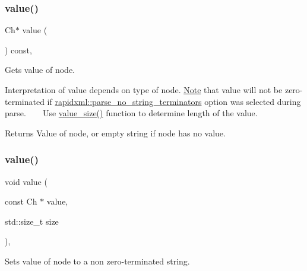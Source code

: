\subsubsection{\texorpdfstring{value()}{value()}\hspace{0.1cm}{\footnotesize\ttfamily [1/3]}}
{\footnotesize\ttfamily Ch$\ast$ value (\begin{DoxyParamCaption}{ }\end{DoxyParamCaption}) const\hspace{0.3cm}{\ttfamily [inline]}, {\ttfamily [inherited]}}



Gets value of node. 

Interpretation of value depends on type of node. \mbox{\hyperlink{classNote}{Note}} that value will not be zero-\/terminated if \mbox{\hyperlink{namespacerapidxml_a9cae3801e70437cbc410c24bf6be691c}{rapidxml\+::parse\+\_\+no\+\_\+string\+\_\+terminators}} option was selected during parse. ~\newline
~\newline
 Use \mbox{\hyperlink{classrapidxml_1_1xml__base_aa6981b3244607ea4ae7634f74f25361b}{value\+\_\+size()}} function to determine length of the value. \begin{DoxyReturn}{Returns}
Value of node, or empty string if node has no value. 
\end{DoxyReturn}
\mbox{\label{classrapidxml_1_1xml__base_ad9640aa3f5374673cb72a5289b6c91eb}} 
\subsubsection{\texorpdfstring{value()}{value()}\hspace{0.1cm}{\footnotesize\ttfamily [2/3]}}
{\footnotesize\ttfamily void value (\begin{DoxyParamCaption}\item[{const Ch $\ast$}]{value,  }\item[{std\+::size\+\_\+t}]{size }\end{DoxyParamCaption})\hspace{0.3cm}{\ttfamily [inline]}, {\ttfamily [inherited]}}



Sets value of node to a non zero-\/terminated string. 

